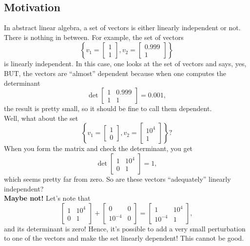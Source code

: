 \subsection{Motivation}

In abstract linear algebra, a set of vectors is either linearly independent or not. There is nothing in between. For example, the set of vectors
$$\left\{ v_1 =  \left[ \begin{array}{l} 1 \\1 \end{array} \right] ,  v_2 =  \left[ \begin{array}{l} 0.999 \\1\end{array} \right] \right\}$$
is linearly independent. In this case, one looks at the set of vectors and says, yes, BUT, the vectors are ``almost'' dependent because when one computes the determinant
$$ \det  \left[ \begin{array}{ll} 1 & 0.999 \\1 & 1\end{array} \right] = 0.001,$$
the result is pretty small, so it should be fine to call them dependent. \\

Well, what about the set
$$\left\{ v_1 =  \left[ \begin{array}{l} 1 \\0 \end{array} \right] ,  v_2 =  \left[ \begin{array}{l} 10^4 \\1 \end{array} \right] \right\} ?$$
When you form the matrix and check the determinant, you get
$$ \det  \left[ \begin{array}{ll} 1 & 10^4 \\0& 1\end{array} \right] = 1,$$
which seems pretty far from zero. So are these vectors ``adequately'' linearly independent?\\

\textbf{Maybe not!} Let's note that
 $$\left[ \begin{array}{ll} 1 & 10^4 \\0& 1\end{array} \right] +  \left[ \begin{array}{ll} 0 & 0 \\10^{-4}& 0\end{array} \right]  =  \left[ \begin{array}{ll} 1 & 10^4 \\10^{-4}& 1\end{array} \right],$$
and its determinant is zero! Hence, it's possible to add a very small perturbation to one of the vectors and make the set linearly dependent! This cannot be good.

